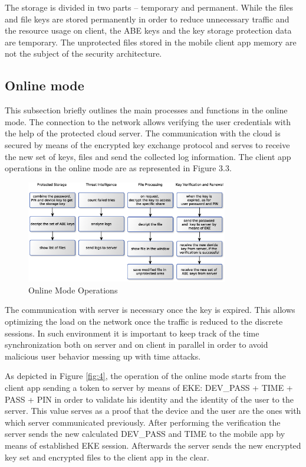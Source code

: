 \documentclass[twocolumn]{svjour3}          %
\begin{document}
The storage is divided in two parts – temporary and permanent. While the files and file keys are stored permanently in order to reduce unnecessary traffic and the resource usage on client, the ABE keys and the key storage protection data are temporary. The unprotected files stored in the mobile client app memory are not the subject of the security architecture.

\subsection{Online mode}
\label{sec_online_mode}
This subsection briefly outlines the main processes and functions in the online mode. The connection to the network allows verifying the user credentials with the help of the protected cloud server. The communication with the cloud is secured by means of the encrypted key exchange protocol \cite{hao2010j, hao2008password} and serves to receive the new set of keys, files and send the collected log information. The client app operations in the online mode are as represented in Figure 3.3.

\begin{figure}[h!]
	\centering
	\includegraphics[width=8.8cm]{figures/onlinemodeoperationss.eps}
	\caption{Online Mode Operations}
	\label{fig:3}
\end{figure}

The communication with server is necessary once the key is expired. This allows optimizing the load on the network once the traffic is reduced to the discrete sessions. In such environment it is important to keep track of the time synchronization both on server and on client in parallel in order to avoid malicious user behavior messing up with time attacks.

As depicted in Figure \ref{fig:4}, the operation of the online mode starts from the client app sending a token to server by means of EKE: DEV\_PASS + TIME + PASS + PIN in order to validate his identity and the identity of the user to the server. This value serves as a proof that the device and the user are the ones with which server communicated previously. After performing the verification the server sends the new calculated DEV\_PASS and TIME to the mobile app by means of established EKE session. Afterwards the server sends the new encrypted key set and encrypted files to the client app in the clear.
\end{document}
